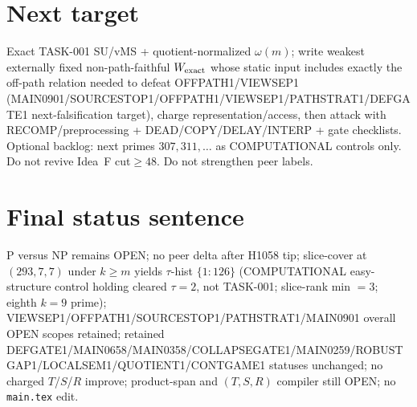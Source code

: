 \documentclass[11pt]{article}
\begin{document}
\section*{Next target}
Exact TASK-001 SU/vMS + quotient-normalized $\omega(m)$; write weakest externally fixed non-path-faithful
$W_{\rm exact}$ whose static input includes exactly the off-path relation needed to defeat OFFPATH1/VIEWSEP1
(MAIN0901/SOURCESTOP1/OFFPATH1/VIEWSEP1/PATHSTRAT1/DEFGATE1 next-falsification target), charge representation/access,
then attack with RECOMP/preprocessing + DEAD/COPY/DELAY/INTERP + gate checklists.
Optional backlog: next primes $307,311,\ldots$ as COMPUTATIONAL controls only.
Do not revive Idea~F cut$\ge48$. Do not strengthen peer labels.

\section*{Final status sentence}
P versus NP remains OPEN; no peer delta after H1058 tip; slice-cover at $(293,7,7)$ under $k{\ge}m$ yields $\tau$-hist $\{1{:}126\}$ (COMPUTATIONAL easy-structure control holding cleared $\tau{=}2$, not TASK-001; slice-rank min $=3$; eighth $k{=}9$ prime); VIEWSEP1/OFFPATH1/SOURCESTOP1/PATHSTRAT1/MAIN0901 overall OPEN scopes retained; retained DEFGATE1/MAIN0658/MAIN0358/COLLAPSEGATE1/MAIN0259/ROBUSTGAP1/LOCALSEM1/QUOTIENT1/CONTGAME1 statuses unchanged; no charged $T$/$S$/$R$ improve; product-span and $(T,S,R)$ compiler still OPEN; no \texttt{main.tex} edit.
\end{document}
